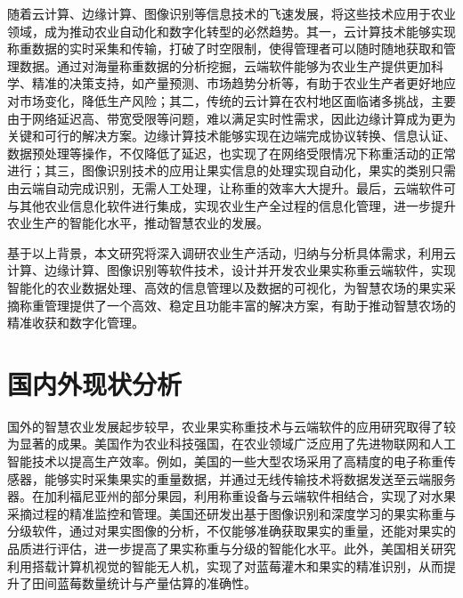 随着云计算、边缘计算、图像识别等信息技术的飞速发展，将这些技术应用于农业领域，成为推动农业自动化和数字化转型的必然趋势。其一，云计算技术能够实现称重数据的实时采集和传输，打破了时空限制，使得管理者可以随时随地获取和管理数据\cite{李道亮2012物联网与智慧农业}。通过对海量称重数据的分析挖掘，云端软件能够为农业生产提供更加科学、精准的决策支持，如产量预测、市场趋势分析等，有助于农业生产者更好地应对市场变化，降低生产风险\cite{韩佳伟2022装备与信息协同促进现代智慧农业发展研究}；其二，传统的云计算在农村地区面临诸多挑战，主要由于网络延迟高、带宽受限等问题，难以满足实时性需求，因此边缘计算成为更为关键和可行的解决方案\cite{aldhaheri2024loracommunicationagriculture40}。边缘计算技术能够实现在边端完成协议转换、信息认证、数据预处理等操作，不仅降低了延迟，也实现了在网络受限情况下称重活动的正常进行\cite{李娜2023基于云边协同计算的粉料仓自称重系统的设计与实现}；其三，图像识别技术的应用让果实信息的处理实现自动化，果实的类别只需由云端自动完成识别，无需人工处理，让称重的效率大大提升\cite{Ni2024}。最后，云端软件可与其他农业信息化软件进行集成\cite{刘洋2013基于物联网与云计算服务的农业温室智能化平台研究与应用术}，实现农业生产全过程的信息化管理，进一步提升农业生产的智能化水平，推动智慧农业的发展。

基于以上背景，本文研究将深入调研农业生产活动，归纳与分析具体需求，利用云计算、边缘计算、图像识别等软件技术，设计并开发农业果实称重云端软件，实现智能化的农业数据处理、高效的信息管理以及数据的可视化，为智慧农场的果实采摘称重管理提供了一个高效、稳定且功能丰富的解决方案，有助于推动智慧农场的精准收获和数字化管理。 

\section{国内外现状分析}

国外的智慧农业发展起步较早，农业果实称重技术与云端软件的应用研究取得了较为显著的成果。美国作为农业科技强国，在农业领域广泛应用了先进物联网和人工智能技术以提高生产效率\cite{赵春江2021智慧农业的发展现状与未来展望}。例如，美国的一些大型农场采用了高精度的电子称重传感器，能够实时采集果实的重量数据，并通过无线传输技术将数据发送至云端服务器\cite{陈学庚2020农业机械与信息技术融合发展现状与方向}。在加利福尼亚州的部分果园，利用称重设备与云端软件相结合，实现了对水果采摘过程的精准监控和管理\cite{Ampatzidis2011}。美国还研发出基于图像识别和深度学习的果实称重与分级软件，通过对果实图像的分析\cite{Anisha2019FruitRU}，不仅能够准确获取果实的重量，还能对果实的品质进行评估，进一步提高了果实称重与分级的智能化水平。此外，美国相关研究利用搭载计算机视觉的智能无人机，实现了对蓝莓灌木和果实的精准识别，从而提升了田间蓝莓数量统计与产量估算的准确性\cite{nguyen2025accuratecropyieldestimation}。

